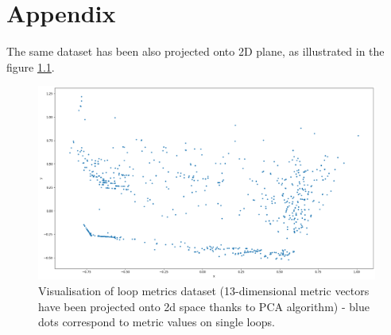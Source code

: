\chapter{Appendix}
\label{appendix}

\qquad The same dataset has been also projected onto 2D plane, as illustrated in the figure \ref{metrics-pca-13-to-2}.

\begin{figure}[htb]
	\centering
	\includegraphics[width=\linewidth]{figs/metrics-pca-13-to-2.png}
	\caption{Visualisation of loop metrics dataset (13-dimensional metric vectors have been projected onto 2d space thanks to PCA algorithm) - blue dots correspond to metric values on single loops.}
	\label{metrics-pca-13-to-2}
\end{figure}
